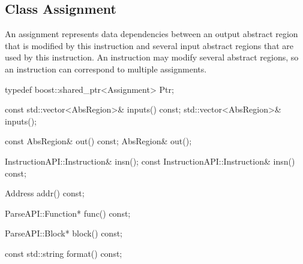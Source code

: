 \subsection{Class Assignment}
\label{sec:assign}

An assignment represents data dependencies between an output abstract region
that is modified by this instruction and several input abstract regions that are
used by this instruction. An instruction may modify several abstract regions,
so an instruction can correspond to multiple assignments.


\begin{apient}
typedef boost::shared_ptr<Assignment> Ptr;
\end{apient}

\begin{apient}
const std::vector<AbsRegion>& inputs() const;
std::vector<AbsRegion>& inputs();
\end{apient}

\begin{apient}
const AbsRegion& out() const;
AbsRegion& out();
\end{apient}

\begin{apient}
InstructionAPI::Instruction& insn();
const InstructionAPI::Instruction& insn() const;
\end{apient}

\begin{apient}
Address addr() const;
\end{apient}

\begin{apient}
ParseAPI::Function* func() const;
\end{apient}

\begin{apient}
ParseAPI::Block* block() const;
\end{apient}

\begin{apient}
const std::string format() const;
\end{apient}


